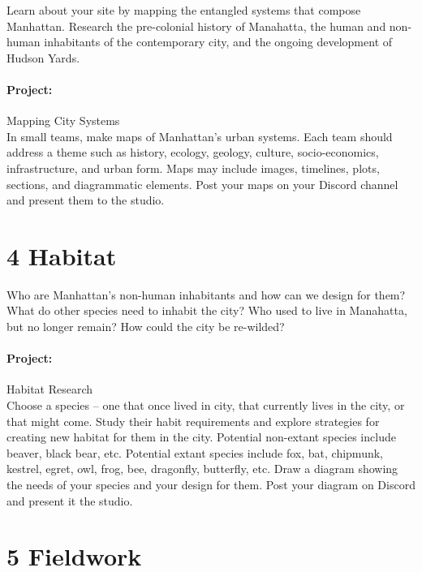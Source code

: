 \documentclass[11pt,article,oneside]{memoir}
\begin{document}
Learn about your site by mapping the entangled systems that compose Manhattan. Research the pre-colonial history of Manahatta, the human and non-human inhabitants of the contemporary city, and the ongoing development of Hudson Yards.

\paragraph{Project:} Mapping City Systems \\

\noindent
In small teams, make maps of Manhattan's urban systems. Each team should address a theme such as history, ecology, geology, culture, socio-economics, infrastructure, and urban form. Maps may include images, timelines, plots, sections, and diagrammatic elements. Post your maps on your Discord channel and present them to the studio. 


\section{4 Habitat}

Who are Manhattan's non-human inhabitants and how can we design for them? What do other species need to inhabit the city? Who used to live in Manahatta, but no longer remain? How could the city be re-wilded? 

\paragraph{Project:} Habitat Research \\

\noindent
Choose a species -- one that once lived in city, that currently lives in the city, or that might come.  
Study their habit requirements and explore strategies for creating new habitat for them in the city. Potential non-extant species include beaver, black bear, etc. Potential extant species include fox, bat, chipmunk, kestrel, egret, owl, frog, bee, dragonfly, butterfly, etc. Draw a diagram showing the needs of your species and your design for them. Post your diagram on Discord and present it the studio. 


\section{5 Fieldwork}
\end{document}
